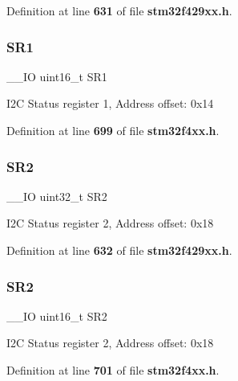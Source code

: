 Definition at line \textbf{ 631} of file \textbf{ stm32f429xx.\+h}.

\mbox{\label{structI2C__TypeDef_a1e79a16729e8d1032d9fe552d50dce41}} 
\subsubsection{S\+R1\hspace{0.1cm}{\footnotesize\ttfamily [2/2]}}
{\footnotesize\ttfamily \+\_\+\+\_\+\+IO uint16\+\_\+t S\+R1}

I2C Status register 1, Address offset\+: 0x14 

Definition at line \textbf{ 699} of file \textbf{ stm32f4xx.\+h}.

\mbox{\label{structI2C__TypeDef_a89623ee198737b29dc0a803310605a83}} 
\subsubsection{S\+R2\hspace{0.1cm}{\footnotesize\ttfamily [1/2]}}
{\footnotesize\ttfamily \+\_\+\+\_\+\+IO uint32\+\_\+t S\+R2}

I2C Status register 2, Address offset\+: 0x18 

Definition at line \textbf{ 632} of file \textbf{ stm32f429xx.\+h}.

\mbox{\label{structI2C__TypeDef_a682809d3f8187cdefb9d615e89b67e65}} 
\subsubsection{S\+R2\hspace{0.1cm}{\footnotesize\ttfamily [2/2]}}
{\footnotesize\ttfamily \+\_\+\+\_\+\+IO uint16\+\_\+t S\+R2}

I2C Status register 2, Address offset\+: 0x18 

Definition at line \textbf{ 701} of file \textbf{ stm32f4xx.\+h}.

\mbox{\label{structI2C__TypeDef_a5d5764c0ec44b661da957e6343f9e7b5}} 
